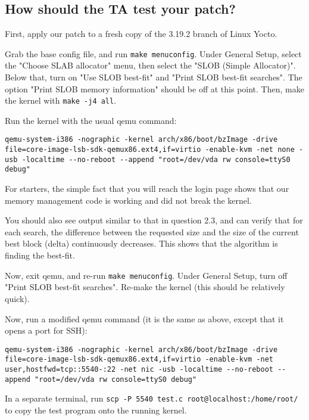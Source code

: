 \documentclass[letterpaper,10pt,titlepage,draftclsnofoot,onecolumn]{article}
\begin{document}
\subsection{How should the TA test your patch?}

First, apply our patch to a fresh copy of the 3.19.2 branch of Linux Yocto.

Grab the base config file, and run \verb`make menuconfig`. Under General Setup, select the "Choose SLAB allocator" menu, then select the "SLOB (Simple Allocator)". Below that, turn on "Use SLOB best-fit" and "Print SLOB best-fit searches". The option "Print SLOB memory information" should be off at this point. Then, make the kernel with \verb`make -j4 all`.

Run the kernel with the usual qemu command:

\begin{lstlisting}[breaklines]
qemu-system-i386 -nographic -kernel arch/x86/boot/bzImage -drive file=core-image-lsb-sdk-qemux86.ext4,if=virtio -enable-kvm -net none -usb -localtime --no-reboot --append "root=/dev/vda rw console=ttyS0 debug"
\end{lstlisting}

For starters, the simple fact that you will reach the login page shows that our memory management code is working and did not break the kernel.

You should also see output similar to that in question 2.3, and can verify that for each search, the difference between the requested size and the size of the current best block (delta) continuously decreases. This shows that the algorithm is finding the best-fit.

Now, exit qemu, and re-run \verb`make menuconfig`. Under General Setup, turn off "Print SLOB best-fit searches". Re-make the kernel (this should be relatively quick).

Now, run a modified qemu command (it is the same as above, except that it opens a port for SSH):

\begin{lstlisting}[breaklines]
qemu-system-i386 -nographic -kernel arch/x86/boot/bzImage -drive file=core-image-lsb-sdk-qemux86.ext4,if=virtio -enable-kvm -net user,hostfwd=tcp::5540-:22 -net nic -usb -localtime --no-reboot --append "root=/dev/vda rw console=ttyS0 debug"
\end{lstlisting}

In a separate terminal, run \verb`scp -P 5540 test.c root@localhost:/home/root/` to copy the test program onto the running kernel.
\end{document}
